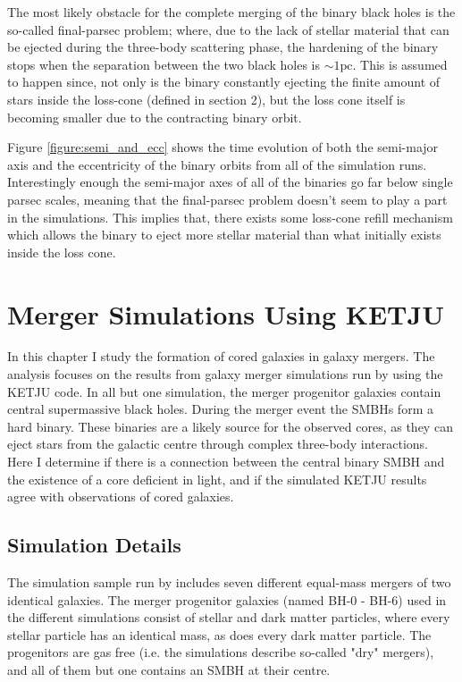 \documentclass[english, oneside]{HYgradu}
\begin{document}
The most likely obstacle for the complete merging of the binary black holes is the so-called final-parsec problem; where, due to the lack of stellar material that can be ejected during the three-body scattering phase, the hardening of the binary stops when the separation between the two black holes is $\sim 1 \mathrm{pc}$. This is assumed to happen since, not only is the binary constantly ejecting the finite amount of stars inside the loss-cone (defined in section 2), but the loss cone itself is becoming smaller due to the contracting binary orbit.

Figure \ref{figure:semi_and_ecc} shows the time evolution of both the semi-major axis and the eccentricity of the binary orbits from all of the simulation runs. Interestingly enough the semi-major axes of all of the binaries go far below single parsec scales, meaning that the final-parsec problem doesn't seem to play a part in the simulations. This implies that, there exists some loss-cone refill mechanism which allows the binary to eject more stellar material than what initially exists inside the loss cone.



\chapter{Merger Simulations Using KETJU}

In this chapter I study the formation of cored galaxies in galaxy mergers. The analysis focuses on the results from galaxy merger simulations run by \cite{Rantala2018} using the KETJU code. In all but one simulation, the merger progenitor galaxies contain central supermassive black holes. During the merger event the SMBHs form a hard binary. These binaries are a likely source for the observed cores, as they can eject stars from the galactic centre through complex three-body interactions. Here I determine if there is a connection between the central binary SMBH and the existence of a core deficient in light, and if the simulated KETJU results agree with observations of cored galaxies.


\section{Simulation Details}

The simulation sample run by \cite{Rantala2018} includes seven different equal-mass mergers of two identical galaxies. The merger progenitor galaxies (named BH-0 - BH-6) used in the different simulations consist of stellar and dark matter particles, where every stellar particle has an identical mass, as does every dark matter particle. The progenitors are gas free (i.e. the simulations describe so-called "dry" mergers), and all of them but one contains an SMBH at their centre.
\end{document}
